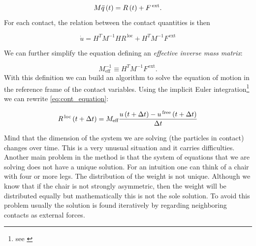 \begin{equation*}
M\ddot{q}\left(t\right) = R\left(t\right) + F^{\,\text{ext}}.
\end{equation*}
For each contact, the relation between the contact quantities is then



\begin{equation}
\dot{u}= H^T M^{-1} H R^{\,\text{loc}} + H^TM^{-1}F^{\,\text{ext}}
\label{eq:cont_equation} 
\end{equation}



We can further simplify the equation defining an \emph{effective inverse mass matrix}:

\begin{equation*}
M^{-1}_{\text{eff}}  \equiv  H^TM^{-1}F^{\,\text{ext}}.
\end{equation*}
With this definition we can build an algorithm to solve the equation of motion in the reference frame of the contact variables. Using the implicit Euler integration\footnote{see \citet{comp_phys}} we can rewrite \eqref{eq:cont_equation}:



\begin{equation}
R^{\,\text{loc}} \left(t+ \Delta t\right) =  M_{\text{eff}}  \frac{u\left(t+\Delta t\right)-u^{\,\text{free}}\left(t+\Delta t\right)}{\Delta t}
\end{equation}

Mind that the dimension of the system we are solving (the particles in contact) changes over time. This is a very unusual situation and it carries difficulties. Another main problem in the method is that the system  of equations that we are solving does not have a unique solution. For an intuition one can think of a chair with four or more legs. The distribution of the weight is not unique. Although we know that if the chair is not strongly asymmetric, then the weight will be distributed equally but mathematically this is not the sole solution. To avoid this problem usually the solution is found iteratively by regarding neighboring contacts as external forces.


